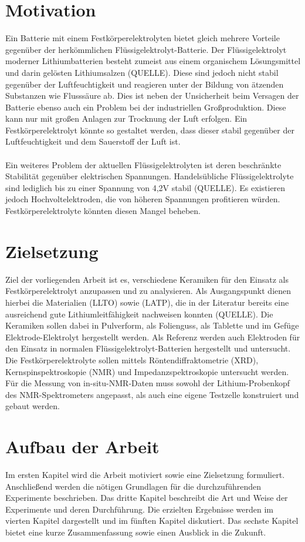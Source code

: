 \documentclass[a4paper, 11pt, headsepline,footsepline,twoside,abstract]{scrbook}
\begin{document}
\section{Motivation}
Ein Batterie mit einem Festkörperelektrolyten bietet gleich mehrere Vorteile gegenüber der herkömmlichen Flüssigelektrolyt-Batterie. Der Flüssigelektrolyt moderner Lithiumbatterien besteht zumeist aus einem organischem Lösungsmittel und darin gelösten Lithiumsalzen (QUELLE). Diese sind jedoch nicht stabil gegenüber der Luftfeuchtigkeit und reagieren unter der Bildung von ätzenden Substanzen wie Flusssäure ab. Dies ist neben der Unsicherheit beim Versagen der Batterie ebenso auch ein Problem bei der industriellen Großproduktion. Diese kann nur mit großen Anlagen zur Trocknung der Luft erfolgen. Ein Festkörperelektrolyt könnte so gestaltet werden, dass dieser stabil gegenüber der Luftfeuchtigkeit und dem Sauerstoff der Luft ist.
\\\\
Ein weiteres Problem der aktuellen Flüssigelektrolyten ist deren beschränkte Stabilität gegenüber elektrischen Spannungen. Handelsübliche Flüssigelektrolyte sind lediglich bis zu einer Spannung von 4,2V stabil (QUELLE). Es existieren jedoch Hochvoltelektroden, die von höheren Spannungen profitieren würden. Festkörperelektrolyte könnten diesen Mangel beheben.
\section{Zielsetzung}
Ziel der vorliegenden Arbeit ist es, verschiedene Keramiken für den Einsatz als Festkörperelektrolyt anzupassen und zu analysieren. Als Ausgangspunkt dienen hierbei die Materialien  (LLTO) sowie  (LATP), die in der Literatur bereits eine ausreichend gute Lithiumleitfähigkeit nachweisen konnten (QUELLE). Die Keramiken sollen dabei in Pulverform, als Folienguss, als Tablette und im Gefüge Elektrode-Elektrolyt hergestellt werden. Als Referenz werden auch Elektroden für den Einsatz in normalen Flüssigelektrolyt-Batterien hergestellt und untersucht. Die Festkörperelektrolyte sollen mittels Röntendiffraktometrie (XRD), Kernspinspektroskopie (NMR) und Impedanzspektroskopie untersucht werden. Für die Messung von in-situ-NMR-Daten muss sowohl der Lithium-Probenkopf des NMR-Spektrometers angepasst, als auch eine eigene Testzelle konstruiert und gebaut werden.
\section{Aufbau der Arbeit}
Im ersten Kapitel wird die Arbeit motiviert sowie eine Zielsetzung formuliert. Anschließend werden die nötigen Grundlagen für die durchzuführenden Experimente beschrieben. Das dritte Kapitel beschreibt die Art und Weise der Experimente und deren Durchführung. Die erzielten Ergebnisse werden im vierten Kapitel dargestellt und im fünften Kapitel diskutiert. Das sechste Kapitel bietet eine kurze Zusammenfassung sowie einen Ausblick in die Zukunft.
\end{document}
